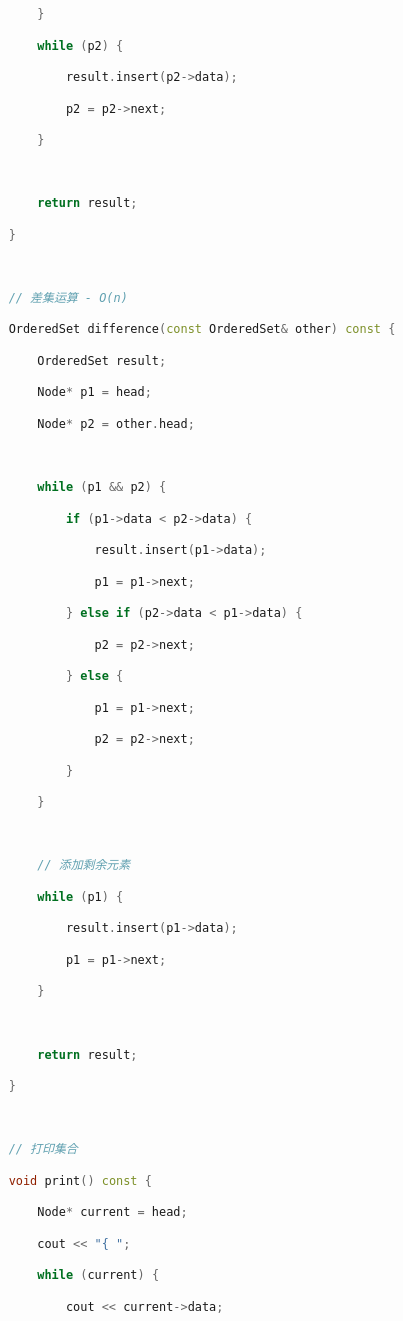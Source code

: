 \begin{lstlisting}[language=C++]
        }

        while (p2) {

            result.insert(p2->data);

            p2 = p2->next;

        }

  

        return result;

    }

  

    // 差集运算 - O(n)

    OrderedSet difference(const OrderedSet& other) const {

        OrderedSet result;

        Node* p1 = head;

        Node* p2 = other.head;

  

        while (p1 && p2) {

            if (p1->data < p2->data) {

                result.insert(p1->data);

                p1 = p1->next;

            } else if (p2->data < p1->data) {

                p2 = p2->next;

            } else {

                p1 = p1->next;

                p2 = p2->next;

            }

        }

  

        // 添加剩余元素

        while (p1) {

            result.insert(p1->data);

            p1 = p1->next;

        }

  

        return result;

    }

  

    // 打印集合

    void print() const {

        Node* current = head;

        cout << "{ ";

        while (current) {

            cout << current->data;


\end{lstlisting}
